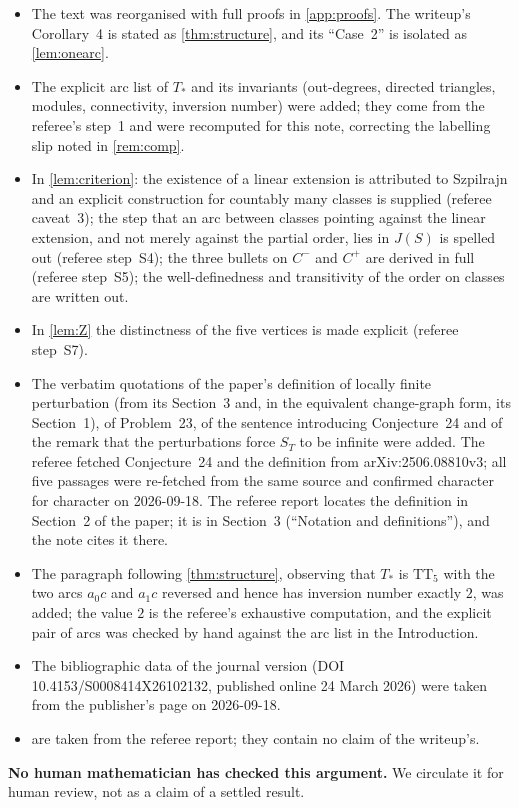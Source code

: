 \documentclass[11pt,a4paper]{article}
\theoremstyle{plain}
\theoremstyle{definition}
\theoremstyle{remark}
\providecommand{\tightlist}{\setlength{\itemsep}{0pt}\setlength{\parskip}{0pt}}
\newcommand{\Tstar}{T_{\ast}}
\newcommand{\TT}{\mathrm{TT}}
\begin{document}
\begin{itemize}\tightlist
\item The text was reorganised with full proofs in \cref{app:proofs}. The writeup's Corollary~4 is stated as \cref{thm:structure}, and its ``Case~2'' is isolated as \cref{lem:onearc}.
\item The explicit arc list of $\Tstar$ and its invariants (out-degrees, directed triangles, modules, connectivity, inversion number) were added; they come from the referee's step~1 and were recomputed for this note, correcting the labelling slip noted in \cref{rem:comp}.
\item In \cref{lem:criterion}: the existence of a linear extension is attributed to Szpilrajn \cite{Sz30} and an explicit construction for countably many classes is supplied (referee caveat~3); the step that an arc between classes pointing against the linear extension, and not merely against the partial order, lies in $J(S)$ is spelled out (referee step~S4); the three bullets on $C^-$ and $C^+$ are derived in full (referee step~S5); the well-definedness and transitivity of the order on classes are written out.
\item In \cref{lem:Z} the distinctness of the five vertices is made explicit (referee step~S7).
\item The verbatim quotations of the paper's definition of locally finite perturbation (from its Section~3 and, in the equivalent change-graph form, its Section~1), of Problem~23, of the sentence introducing Conjecture~24 and of the remark that the perturbations force $S_T$ to be infinite were added. The referee fetched Conjecture~24 and the definition from arXiv:2506.08810v3; all five passages were re-fetched from the same source and confirmed character for character on 2026-09-18. The referee report locates the definition in Section~2 of the paper; it is in Section~3 (``Notation and definitions''), and the note cites it there.
\item The paragraph following \cref{thm:structure}, observing that $\Tstar$ is $\TT_5$ with the two arcs $a_0c$ and $a_1c$ reversed and hence has inversion number exactly $2$, was added; the value $2$ is the referee's exhaustive computation, and the explicit pair of arcs was checked by hand against the arc list in the Introduction.
\item The bibliographic data of the journal version (DOI 10.4153/S0008414X26102132, published online 24 March 2026) were taken from the publisher's page on 2026-09-18.
\item {} are taken from the referee report; they contain no claim of the writeup's.
\end{itemize}
\textbf{No human mathematician has checked this argument.} We circulate it for human review, not as a claim of a settled result.
\end{document}
